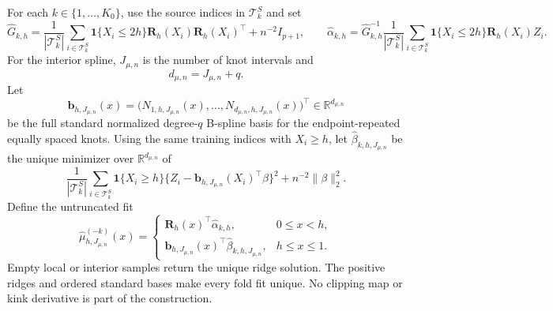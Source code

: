 For each \(k\in\{1,\ldots,K_0\}\), use the source indices in \(\mathcal T^S_k\) and set
\[
\widehat G_{k,h}=\frac1{|\mathcal T^S_k|}\sum_{i\in\mathcal T^S_k}\mathbf 1\{X_i\le2h\}\mathbf R_h(X_i)\mathbf R_h(X_i)^\top+n^{-2}I_{p+1},
\qquad
\widehat\alpha_{k,h}=\widehat G_{k,h}^{-1}\frac1{|\mathcal T^S_k|}\sum_{i\in\mathcal T^S_k}\mathbf 1\{X_i\le2h\}\mathbf R_h(X_i)Z_i.
\]
For the interior spline, \(J_{\mu,n}\) is the number of knot intervals and
\[
d_{\mu,n}=J_{\mu,n}+q.
\]
Let
\[
\mathbf b_{h,J_{\mu,n}}(x)
=\bigl(N_{1,h,J_{\mu,n}}(x),\ldots,N_{d_{\mu,n},h,J_{\mu,n}}(x)\bigr)^\top
\in\mathbb R^{d_{\mu,n}}
\]
be the full standard normalized degree-\(q\) B-spline basis for the endpoint-repeated equally spaced knots. Using the same training indices with \(X_i\ge h\), let \(\widehat\beta_{k,h,J_{\mu,n}}\) be the unique minimizer over \(\mathbb R^{d_{\mu,n}}\) of
\[
\frac1{|\mathcal T^S_k|}\sum_{i\in\mathcal T^S_k}\mathbf 1\{X_i\ge h\}
\{Z_i-\mathbf b_{h,J_{\mu,n}}(X_i)^\top\beta\}^2+n^{-2}\|\beta\|_2^2.
\]
Define the untruncated fit
\[
\widehat\mu^{(-k)}_{h,J_{\mu,n}}(x)=
\begin{cases}
\mathbf R_h(x)^\top\widehat\alpha_{k,h},&0\le x<h,\\
\mathbf b_{h,J_{\mu,n}}(x)^\top\widehat\beta_{k,h,J_{\mu,n}},&h\le x\le1.
\end{cases}
\]
Empty local or interior samples return the unique ridge solution. The positive ridges and ordered standard bases make every fold fit unique. No clipping map or kink derivative is part of the construction.